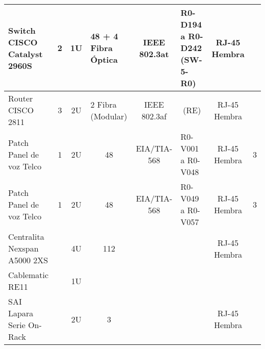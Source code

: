 \begin{table}[htbp]
\begin{tabular}{|p{2.5cm}|p{1.6cm}|llllll}
		Switch CISCO Catalyst 2960S                                        & \multicolumn{1}{c|}{2}                      & \multicolumn{1}{c|}{1U}              & \multicolumn{1}{p{1.2cm}|}{48 + 4 Fibra Óptica} & \multicolumn{1}{c|}{IEEE 802.3at}      & \multicolumn{1}{p{1.6cm}|}{R0-D194 a R0-D242 (SW-5-R0)} & \multicolumn{1}{c|}{RJ-45 Hembra}              & \multicolumn{1}{c|}{}                   \\ \hline
		Router CISCO 2811                                                  & \multicolumn{1}{c|}{3}                      & \multicolumn{1}{c|}{2U}              & \multicolumn{1}{p{1.2cm}|}{2 Fibra (Modular)}   & \multicolumn{1}{c|}{IEEE 802.3af}      & \multicolumn{1}{c|}{(RE)}                        & \multicolumn{1}{c|}{RJ-45 Hembra}              & \multicolumn{1}{c|}{}                   \\ \hline
		Patch Panel de voz Telco                                           & \multicolumn{1}{c|}{1}                      & \multicolumn{1}{c|}{2U}              & \multicolumn{1}{c|}{48}                  & \multicolumn{1}{c|}{EIA/TIA-568}       & \multicolumn{1}{p{1.6cm}|}{R0-V001 a R0-V048}           & \multicolumn{1}{c|}{RJ-45 Hembra}              & \multicolumn{1}{c|}{3}                  \\ \hline
		Patch Panel de voz Telco                                           & \multicolumn{1}{c|}{1}                      & \multicolumn{1}{c|}{2U}              & \multicolumn{1}{c|}{48}                  & \multicolumn{1}{c|}{EIA/TIA-568}       & \multicolumn{1}{p{1.6cm}|}{R0-V049 a R0-V057}           & \multicolumn{1}{c|}{RJ-45 Hembra}              & \multicolumn{1}{c|}{3}                  \\ \hline
		Centralita Nexspan A5000 2XS                                        &                            	   	 		 & \multicolumn{1}{c|}{4U}              & \multicolumn{1}{c|}{112}                 & \multicolumn{1}{c|}{}                  & \multicolumn{1}{c|}{}                            & \multicolumn{1}{c|}{RJ-45 Hembra}              & \multicolumn{1}{c|}{}                   \\ \hline
		Cablematic RE11                                                    &                           					 & \multicolumn{1}{c|}{1U}              & \multicolumn{1}{c|}{}                    & \multicolumn{1}{c|}{}                  & \multicolumn{1}{c|}{}                            & \multicolumn{1}{c|}{}                          & \multicolumn{1}{c|}{}                   \\ \hline
		SAI Lapara Serie On-Rack                                           &                          				     & \multicolumn{1}{c|}{2U}              & \multicolumn{1}{c|}{3}                   & \multicolumn{1}{c|}{}                  & \multicolumn{1}{c|}{}                            & \multicolumn{1}{c|}{RJ-45 Hembra}              & \multicolumn{1}{c|}{}                   \\ \hline
		
	\end{tabular}
\end{table}

